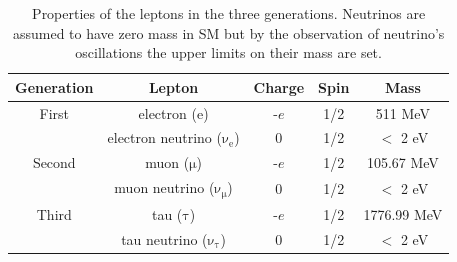 \begin{table}[!hbpt]
\begin{center}
\begin{tabular}{|c|c|c|c|c|}
\hline
Generation & Lepton                               & Charge &Spin & Mass \\ \hline
First      & electron ($\mathrm{e}$)              & -$e$   &1/2  & 511 MeV\\
           & electron neutrino ($\mathrm{\nu_e}$) & 0      &1/2  & $<$ 2 eV\\ \hline
Second     & muon ($\mathrm{\mu}$)                & -$e$   &1/2  & 105.67 MeV\\
           & muon neutrino ($\mathrm{\nu_{\mu}}$) & 0      &1/2  & $<$ 2 eV\\ \hline
Third      & tau ($\mathrm{\tau}$)                & -$e$   &1/2  & 1776.99 MeV\\
           & tau neutrino ($\mathrm{\nu_{\tau}}$) & 0      &1/2  & $<$ 2 eV\\ \hline
 \end{tabular}
 \end{center}
 \caption{Properties of the leptons in the three generations. Neutrinos are assumed to have zero mass in SM but by the observation of neutrino's oscillations the upper limits on their mass are set\cite{Olive:2016xmw}.\label{tab:leptons}}
 \end{table}

